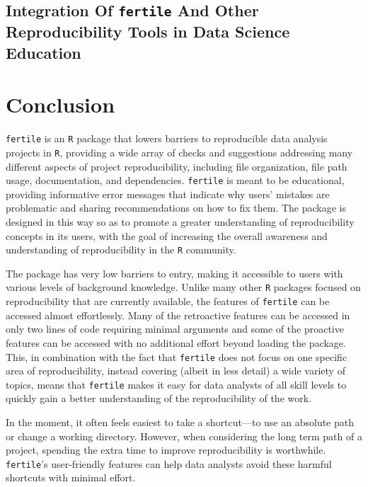 \documentclass[12pt,twoside]{reedthesis}
\begin{document}
\section{\texorpdfstring{Integration Of \texttt{fertile} And Other
Reproducibility Tools in Data Science
Education}{Integration Of fertile And Other Reproducibility Tools in Data Science Education}}\label{integration-of-fertile-and-other-reproducibility-tools-in-data-science-education}

\chapter*{Conclusion}\label{conclusion}

\texttt{fertile} is an \texttt{R} package that lowers barriers to
reproducible data analysis projects in \texttt{R}, providing a wide
array of checks and suggestions addressing many different aspects of
project reproducibility, including file organization, file path usage,
documentation, and dependencies. \texttt{fertile} is meant to be
educational, providing informative error messages that indicate why
users' mistakes are problematic and sharing recommendations on how to
fix them. The package is designed in this way so as to promote a greater
understanding of reproducibility concepts in its users, with the goal of
increasing the overall awareness and understanding of reproducibility in
the \texttt{R} community.

The package has very low barriers to entry, making it accessible to
users with various levels of background knowledge. Unlike many other
\texttt{R} packages focused on reproducibility that are currently
available, the features of \texttt{fertile} can be accessed almost
effortlessly. Many of the retroactive features can be accessed in only
two lines of code requiring minimal arguments and some of the proactive
features can be accessed with no additional effort beyond loading the
package. This, in combination with the fact that \texttt{fertile} does
not focus on one specific area of reproducibility, instead covering
(albeit in less detail) a wide variety of topics, means that
\texttt{fertile} makes it easy for data analysts of all skill levels to
quickly gain a better understanding of the reproducibility of the work.

In the moment, it often feels easiest to take a shortcut---to use an
absolute path or change a working directory. However, when considering
the long term path of a project, spending the extra time to improve
reproducibility is worthwhile. \texttt{fertile}'s user-friendly features
can help data analysts avoid these harmful shortcuts with minimal
effort.
\end{document}
